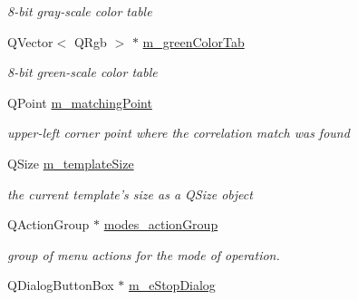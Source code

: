 \begin{CompactItemize}
\begin{CompactList}\small\item\em 8-bit gray-scale color table \item\end{CompactList}\item 
\hypertarget{classQcorr_795a9f4f9805a241f55c59a0a520f3d4}{
QVector$<$ QRgb $>$ $\ast$ \hyperlink{classQcorr_795a9f4f9805a241f55c59a0a520f3d4}{m\_\-greenColorTab}}
\label{classQcorr_795a9f4f9805a241f55c59a0a520f3d4}

\begin{CompactList}\small\item\em 8-bit green-scale color table \item\end{CompactList}\item 
\hypertarget{classQcorr_8a7f00160ae46441cef038149cf28bdc}{
QPoint \hyperlink{classQcorr_8a7f00160ae46441cef038149cf28bdc}{m\_\-matchingPoint}}
\label{classQcorr_8a7f00160ae46441cef038149cf28bdc}

\begin{CompactList}\small\item\em upper-left corner point where the correlation match was found \item\end{CompactList}\item 
\hypertarget{classQcorr_bc48bdd2110cfdaf7b98dde1cdf42f18}{
QSize \hyperlink{classQcorr_bc48bdd2110cfdaf7b98dde1cdf42f18}{m\_\-templateSize}}
\label{classQcorr_bc48bdd2110cfdaf7b98dde1cdf42f18}

\begin{CompactList}\small\item\em the current template's size as a QSize object \item\end{CompactList}\item 
\hypertarget{classQcorr_3a964df80562c062d5f1f4f6cbf841bb}{
QActionGroup $\ast$ \hyperlink{classQcorr_3a964df80562c062d5f1f4f6cbf841bb}{modes\_\-actionGroup}}
\label{classQcorr_3a964df80562c062d5f1f4f6cbf841bb}

\begin{CompactList}\small\item\em group of menu actions for the mode of operation. \item\end{CompactList}\item 
\hypertarget{classQcorr_496beab48555a8c9abbd6f6aa48e52fb}{
QDialogButtonBox $\ast$ \hyperlink{classQcorr_496beab48555a8c9abbd6f6aa48e52fb}{m\_\-eStopDialog}}
\label{classQcorr_496beab48555a8c9abbd6f6aa48e52fb}


\end{CompactItemize}
